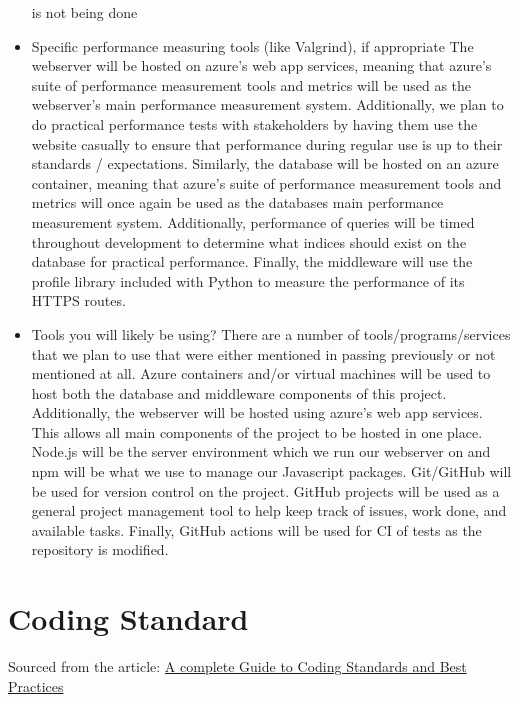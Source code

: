 \documentclass{article}
\begin{document}
\begin{itemize}
  is not being done
\item Specific performance measuring tools (like Valgrind), if
  appropriate
\subitem The webserver will be hosted on azure's web app services, meaning that
azure's suite of performance measurement tools and metrics will be used as the 
webserver's main performance measurement system. Additionally, we plan to do
practical performance tests with stakeholders by having them use the website 
casually to ensure that performance during regular use is up to their standards 
/ expectations.
\subitem Similarly, the database will be hosted on an azure container, meaning 
that azure's suite of performance measurement tools and metrics will once again 
be used as the databases main performance measurement system. Additionally, 
performance of queries will be timed throughout development to determine what 
indices should exist on the database for practical performance.
\subitem Finally, the middleware will use the profile library included with 
Python to measure the performance of its HTTPS routes.
\item Tools you will likely be using?
\subitem There are a number of tools/programs/services that we plan to use that 
were either mentioned in passing previously or not mentioned at all.
\subitem Azure containers and/or virtual machines will be used to host both the 
database and middleware components of this project. Additionally, the webserver 
will be hosted using azure's web app services. This allows all main components 
of the project to be hosted in one place.
\subitem Node.js will be the server environment which we run our webserver on 
and npm will be what we use to manage our Javascript 
packages.
\subitem Git/GitHub will be used for version control on the project. GitHub 
projects will be used as a general project management tool to help keep 
track of issues, work done, and available tasks. Finally, GitHub actions will 
be used for CI of tests as the repository is modified.
\end{itemize}


\section{Coding Standard}


Sourced from the article: \newline
\href{https://www.lambdatest.com/learning-hub/coding-standards}{A complete Guide to Coding Standards and Best Practices}
\newline
\end{document}
